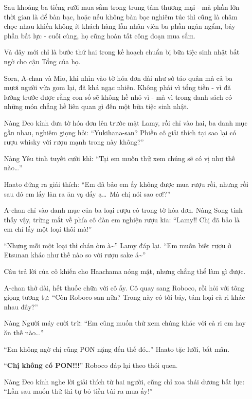 \documentclass[../main.tex]{subfiles}
\begin{document}
\ct

Sau khoảng ba tiếng rưỡi mua sắm trong trung tâm thương mại - mà phần lớn thời gian là để bàn bạc, hoặc nếu không bàn bạc nghiêm túc thì cũng là châm chọc nhau khiến không ít khách hàng lẫn nhân viên ba phần ngán ngẩm, bảy phần bất lực - cuối cùng, họ cũng hoàn tất công đoạn mua sắm.

Và đây mới chỉ là bước thứ hai trong kế hoạch chuẩn bị bữa tiệc sinh nhật bất ngờ cho cậu Tổng của họ.

Sora, A-chan và Mio, khi nhìn vào tờ hóa đơn dài như sớ táo quân mà cả ba mươi người vừa gom lại, đã khá ngạc nhiên. Không phải vì tổng tiền - vì đã lường trước được rằng con số sẽ không hề nhỏ vì - mà vì trong danh sách có những món chẳng hề liên quan gì đến một bữa tiệc sinh nhật.

Nàng Đeo kính đưa tờ hóa đơn lên trước mặt Lamy, rồi chỉ vào hai, ba danh mục gần nhau, nghiêm giọng hỏi: ``Yukihana-san? Phiền cô giải thích tại sao lại có rượu whisky với rượu mạnh trong này không?''

Nàng Yêu tinh tuyết cười khì: ``Tại em muốn thử xem chúng sẽ có vị như thế nào\dots''

Haato đứng ra giải thích: ``Em đã bảo em ấy không được mua rượu rồi, nhưng rồi sau đó em lấy lăn ra ăn vạ đấy ạ\dots\ Mà chị nói sao cơ!?''

A-chan chỉ vào danh mục của ba loại rượu có trong tờ hóa đơn. Nàng Song tính thấy vậy, trừng mắt về phía cô đàn em nghiện rượu kia: ``Lamy!! Chị đã bảo là em chỉ lấy một loại thôi mà!''

``Nhưng mỗi một loại thì chán òm à\~{}'' Lamy đáp lại. ``Em muốn biết rượu ở Etsunan khác như thế nào so với rượu sake á\~{}''

Câu trả lời của cô khiến cho Haachama nóng mặt, nhưng chẳng thể làm gì được.

A-chan thở dài, hết thuốc chữa với cô ấy. Cô quay sang Roboco, rồi hỏi với tông giọng tương tự: ``Còn Roboco-san nữa? Trong này có tới bảy, tám loại cà ri khác nhau đây?''

Nàng Người máy cười trừ: ``Em cũng muốn thử xem chúng khác với cà ri em hay ăn thế nào\dots''

``Em không ngờ chị cũng PON nặng đến thế đó\dots'' Haato tặc lưỡi, bất mãn.

``\textbf{Chị không có PON!!!}'' Roboco đáp lại theo thói quen.

Nàng Đeo kính nghe lời giải thích từ hai người, cũng chỉ xoa thái dương bất lực: ``Lần sau muốn thử thì tự bỏ tiền túi ra mua ấy!''
\end{document}

